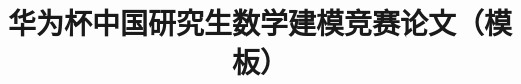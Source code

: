 \documentclass[UTF8,a4paper,12pt]{ctexart}
\title{华为杯中国研究生数学建模竞赛论文（模板）}
\author{}
\date{}
\begin{document}
\maketitle
\begin{abstract}
\end{abstract}
\tableofcontents












\end{document}

